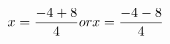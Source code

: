 \documentclass[preview]{standalone}
\begin{document}
\begin{align*}
\special{dvisvgm:raw <g id='unique000'>}x=\frac{-4 + {8}}{4} or x=\frac{-4 - {8}}{4}\special{dvisvgm:raw </g>}
\end{align*}
\end{document}
